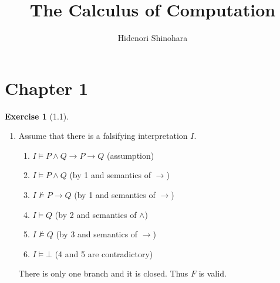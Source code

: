 \documentclass[12pt, psamsfonts]{amsart}
\theoremstyle{definition}
\newtheorem*{exer}{Exercise}
\theoremstyle{remark}
\numberwithin{equation}{subsection}
\begin{document}
\title{The Calculus of Computation}
\author{Hidenori Shinohara}

\maketitle

\section{Chapter 1}

\begin{exer}[1.1]
    $ $
    \begin{enumerate}[label=(\alph*)]
        \item
            Assume that there is a falsifying interpretation $I$.
            \begin{enumerate}[label=\arabic*.]
                \item %
                    $I \models P \land Q \rightarrow P \rightarrow Q$ (assumption)
                \item %
                    $I \models P \land Q$ (by 1 and semantics of $\rightarrow$)
                \item %
                    $I \not\models P \rightarrow Q$ (by 1 and semantics of $\rightarrow$)
                \item %
                    $I \models Q$ (by 2 and semantics of $\land$)
                \item %
                    $I \not\models Q$ (by 3 and semantics of $\rightarrow$)
                \item %
                    $I \models \bot$ (4 and 5 are contradictory)
            \end{enumerate}
            There is only one branch and it is closed.
            Thus $F$ is valid.
    \end{enumerate}
\end{exer}
\end{document}
